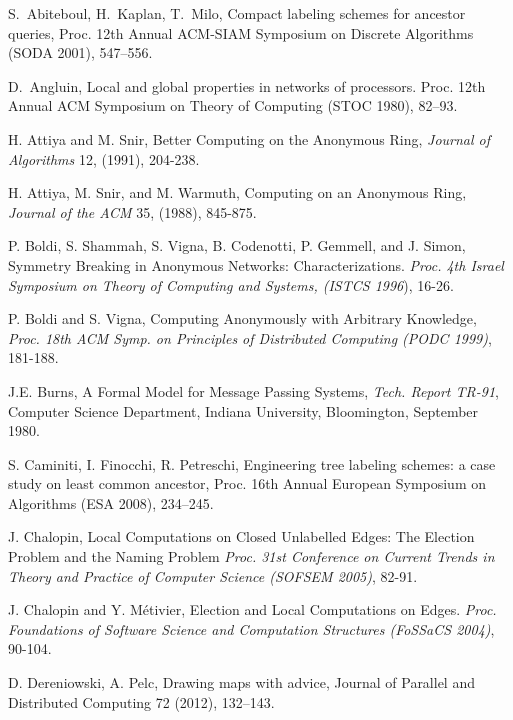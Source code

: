 \documentclass[11pt]{article}
\begin{document}

\begin{thebibliography}{12}
S.~Abiteboul, H.~Kaplan, T.~Milo, Compact labeling schemes for ancestor
queries, Proc. 12th Annual ACM-SIAM Symposium on Discrete
Algorithms (SODA 2001), 547--556.

D.~Angluin, Local and global properties in networks of processors. 
Proc. 12th Annual ACM Symposium on Theory of Computing (STOC 1980), 82--93.


H. Attiya and M. Snir,
Better Computing on the Anonymous Ring,
{\em Journal of Algorithms} 12, (1991), 204-238.



H. Attiya, M. Snir, and M. Warmuth,
Computing on an Anonymous Ring,
{\em Journal of the ACM} 35, (1988), 845-875.

P. Boldi, S. Shammah, S. Vigna, B. Codenotti, P. Gemmell, and J. Simon,
Symmetry Breaking in Anonymous Networks: Characterizations. 
{\em Proc. 4th Israel Symposium on Theory of Computing and Systems,
(ISTCS 1996}), 16-26.




P. Boldi and S. Vigna,
Computing Anonymously with Arbitrary Knowledge,
{\em Proc. 18th ACM Symp. on Principles of Distributed Computing (PODC 1999)}, 181-188.

J.E. Burns, A Formal Model for Message Passing Systems,
{\em Tech. Report TR-91}, Computer Science Department,
Indiana University, Bloomington, September 1980.



S. Caminiti, I. Finocchi, R. Petreschi,
Engineering tree labeling schemes: a case study on least common ancestor,
Proc. 16th Annual European Symposium on Algorithms (ESA 2008), 234--245.

J. Chalopin,
Local Computations on Closed Unlabelled Edges: The Election Problem and the Naming Problem 
{\em Proc. 31st Conference on Current Trends in Theory and Practice of Computer Science (SOFSEM 2005)}, 82-91.

J. Chalopin and Y. M\'etivier,
Election and Local Computations on Edges.
{\em Proc. Foundations of Software Science and Computation Structures (FoSSaCS 2004)}, 90-104.



D. Dereniowski, A. Pelc, Drawing maps with advice,  Journal of Parallel and Distributed Computing 72 (2012), 132--143. 



\end{thebibliography}
\end{document}
